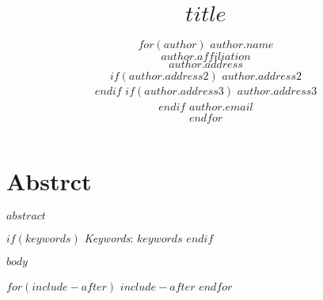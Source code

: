 \documentclass[numbered]{trbunofficial}
\title{$title$}
\author{
  $for(author)$
    \textbf{$author.name$} \\
    {$author.affiliation$} \\
    {$author.address$} \\ $if(author.address2)$ {$author.address2$} \\ $endif$ $if(author.address3)$ {$author.address3$} \\ $endif$
    {$author.email$} \\
    \hfill\break%
  $endfor$
}
\begin{document}
\nolinenumbers
\maketitle

\linenumbers

\section{Abstrct}
$abstract$
\hfill\break

$if(keywords)$
  \noindent\textit{Keywords}: $keywords$
$endif$

\newpage

$body$

$for(include-after)$
$include-after$
$endfor$
\end{document}
